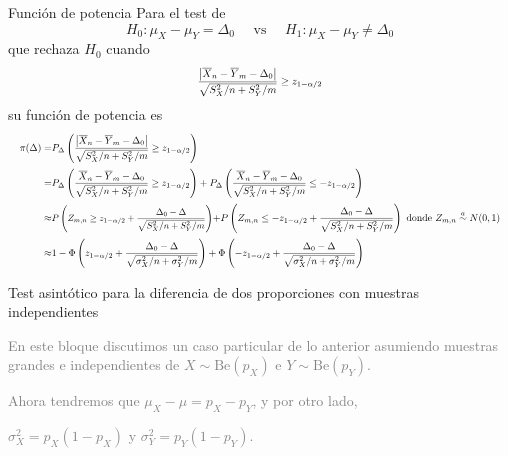 \documentclass{beamer}
\theoremstyle{definition}
\newcommand\scalemath[2]{\scalebox{#1}{\mbox{\ensuremath{\displaystyle #2}}}}
\begin{document}
\begin{frame}{\color{rosee} Funci\'on de potencia}
\small
Para el test de
$$
H_0: \mu_X-\mu_Y=\Delta_0 \quad \text { vs } \quad H_1: \mu_X-\mu_Y \neq \Delta_0
$$
que rechaza $H_0$ cuando
$$\scalemath{0.75}{
\frac{\left|\overline{X}_{n}-\overline{Y}_{m}-\Delta_0\right|}{\sqrt{S_X^2 / n+S_Y^2 / m}} \geq z_{1-\alpha / 2}}
$$
su funci\'on de potencia es
$$
\begin{aligned}\scalemath{0.7}{
\pi(\Delta)=}& \scalemath{0.7}{P_{\Delta}\left(\frac{\left|\overline{X}_{n}-\overline{Y}_{m}-\Delta_0\right|}{\sqrt{S_X^2 / n+S_Y^2 / m}} \geq z_{1-\alpha / 2}\right)} \\
\scalemath{0.7}{=}&\scalemath{0.7}{ P_{\Delta}\left(\frac{\overline{X}_{n}-\overline{Y}_{m}-\Delta_0}{\sqrt{S_X^2 / n+S_Y^2 / m}} \geq z_{1-\alpha / 2}\right)+P_{\Delta}\left(\frac{\overline{X}_{n}-\overline{Y}_{m}-\Delta_0}{\sqrt{S_X^2 / n+S_Y^2 / m}} \leq-z_{1-\alpha / 2}\right)} \\
\scalemath{0.7}{\approx} & \scalemath{0.65}{P\left(Z_{m,n} \geq z_{1-\alpha / 2}+\frac{\Delta_0-\Delta}{\sqrt{S_X^2 / n+S_Y^2 / m}}\right)} \scalemath{0.7}{+P\left(Z_{m,n} \leq-z_{1-\alpha / 2}+\frac{\Delta_0-\Delta}{\sqrt{S_X^2 / n+S_Y^2 / m}}\right) \text { donde } Z_{m,n} \stackrel{a}{\sim} N(0,1)} \\
\scalemath{0.7}{\approx}& \scalemath{0.7}{1-\Phi\left(z_{1-\alpha / 2}+\frac{\Delta_0-\Delta}{\sqrt{\sigma_X^2 / n+\sigma_Y^2 / m}}\right)+\Phi\left(-z_{1-\alpha / 2}+\frac{\Delta_0-\Delta}{\sqrt{\sigma_X^2 / n+\sigma_Y^2 / m}}\right)}
\end{aligned}
$$
\end{frame}




\begin{frame}
\begin{center}
    \Large{Test asint\'otico para la diferencia de dos
   proporciones}
   con muestras \textcolor{rosee}{independientes}
   \end{center}
\bigskip
\textcolor{gray}{En este  bloque discutimos un caso particular de lo anterior asumiendo muestras grandes e independientes de  $X\sim\text{Be}(p_X)$ e $Y\sim \text{Be}(p_Y)$.}\medskip
\begin{itemize}
    \item \textcolor{gray}{Ahora tendremos que $\mu_X-\mu = p_X - p_Y$, y por otro lado,\medskip
    \item $\sigma^2_X=p_X(1-p_X)$ y $\sigma^2_Y=p_Y(1-p_Y)$.}
    
\end{itemize}

   
\end{frame}
\end{document}
